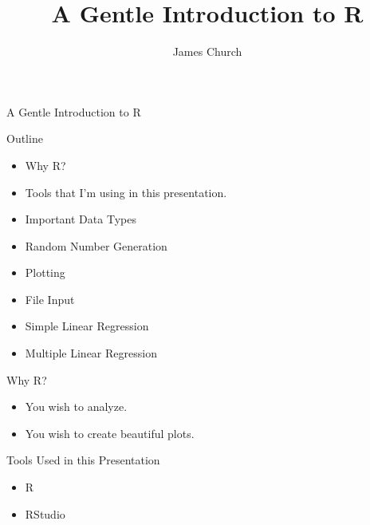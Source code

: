 \documentclass{beamer}
\author{James Church}
\title{A Gentle Introduction to R}
\begin{document}
\frame[plain]{ \titlepage }

\begin{frame}{A Gentle Introduction to R}

    Outline

    \begin{itemize}
        \item Why R?
        \item Tools that I'm using in this presentation.
        \item Important Data Types
        \item Random Number Generation
        \item Plotting
        \item File Input
        \item Simple Linear Regression
        \item Multiple Linear Regression
    \end{itemize}

\end{frame}

\begin{frame}{Why R?}
     \begin{itemize}
        \item You wish to analyze.
        \item You wish to create beautiful plots.
    \end{itemize}
\end{frame}

\begin{frame}{Tools Used in this Presentation}
    \begin{itemize}
        \item R
        \item RStudio
    \end{itemize}
\end{frame}
\end{document}
